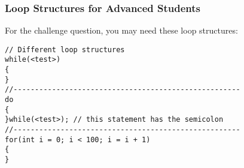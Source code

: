 \documentclass{beamer}
\begin{document}
\begin{frame}[fragile]
\frametitle{Loop Structures for Advanced Students}
For the challenge question, you may need these loop structures:
\begin{verbatim}
// Different loop structures
while(<test>)
{
}
//-----------------------------------------------------
do
{
}while(<test>); // this statement has the semicolon
//-----------------------------------------------------
for(int i = 0; i < 100; i = i + 1)
{
}
\end{verbatim}
\end{frame}
\end{document}
